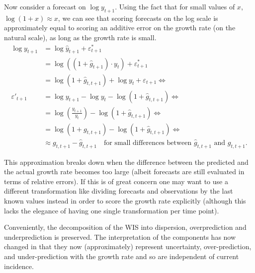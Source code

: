 \documentclass{article}
\begin{document}
Now consider a forecast on $\log y_{t+1}$. Using the fact that for small values of $x$, $\log (1+ x) \approx x$, we can see that scoring forecasts on the log scale is approximately equal to scoring an additive error on the growth rate (on the natural scale), as long as the growth rate is small.
%
\begin{align}
\log y_{t+1}        &= \log \hat{y}_{t+1} + \varepsilon^*_{t+1} \\
                    &= \log ((1 + \hat{g}_{t+1}) \cdot y_{t}) + \varepsilon^*_{t+1} \\
                    &= \log (1 + \hat{g}_{t, t+1}) + \log y_t + \varepsilon_{t+1} \Leftrightarrow \\
\varepsilon'_{t+1}  &= \log y_{t+1} -  \log y_t - \log (1 + \hat{g}_{t, t+1}) \Leftrightarrow \\    
                    &= \log (\frac{y_{t+1}}{y_t}) - \log (1 + \hat{g}_{t, t+1}) \Leftrightarrow \\    
                    &= \log (1 + g_{t, t+1}) - \log (1 + \hat{g}_{t, t+1}) \Leftrightarrow \\   
                    &\approx g_{t, t+1} - \hat{g}_{t, t+1} \quad \text{for small differences between } \hat{g}_{t, t+1} \text{ and } g_{t, t+1}. 
\end{align}

This approximation breaks down when the difference between the predicted and the actual growth rate becomes too large (albeit forecasts are still evaluated in terms of relative errors). If this is of great concern one may want to use a different transformation like dividing forecasts and observations by the last known values instead in order to score the growth rate explicitly (although this lacks the elegance of having one single transformation per time point). 

Conveniently, the decomposition of the WIS into dispersion, overprediction and underprediction is preserved. The interpretation of the components has now changed in that they now (approximately) represent uncertainty, over-prediction, and under-prediction with the growth rate and so are independent of current incidence. 
\end{document}

